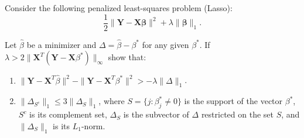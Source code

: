 \begin{exercise}\label{probability:2015:10}
Consider the following penalized least-squares problem (Lasso):
\[
\frac{1}{2}\|\mathbf{Y} - \mathbf{X}\boldsymbol{\beta}\|^2 + \lambda\|\boldsymbol{\beta}\|_1.
\]

Let $\widehat{\beta}$ be a minimizer and $\Delta = \widehat{\beta} - \beta^*$ for any given $\beta^*$. If $\lambda > 2\|\mathbf{X}^T(\mathbf{Y} - \mathbf{X}\beta^*)\|_\infty$ show that:
\begin{enumerate}
    \item $\|\mathbf{Y} - \mathbf{X}^T\widehat{\beta}\|^2 - \|\mathbf{Y} - \mathbf{X}^T\beta^*\|^2 > -\lambda\|\Delta\|_1$.
    \item $\|\Delta_{S^c}\|_1 \leq 3\|\Delta_S\|_1$, where $S = \{j: \beta_j^* \neq 0\}$ is the support of the vector $\beta^*$, $S^c$ is its complement set, $\Delta_S$ is the subvector of $\Delta$ restricted on the set $S$, and $\|\Delta_S\|_1$ is its $L_1$-norm.
\end{enumerate}
\end{exercise}

